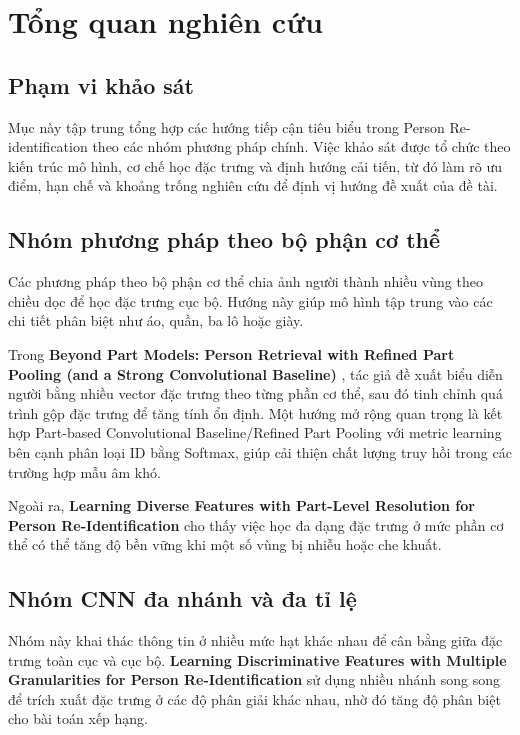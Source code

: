 \section{Tổng quan nghiên cứu}

\subsection{Phạm vi khảo sát}
Mục này tập trung tổng hợp các hướng tiếp cận tiêu biểu trong Person Re-identification theo các nhóm phương pháp chính. Việc khảo sát được tổ chức theo kiến trúc mô hình, cơ chế học đặc trưng và định hướng cải tiến, từ đó làm rõ ưu điểm, hạn chế và khoảng trống nghiên cứu để định vị hướng đề xuất của đề tài.

\subsection{Nhóm phương pháp theo bộ phận cơ thể}
Các phương pháp theo bộ phận cơ thể chia ảnh người thành nhiều vùng theo chiều dọc để học đặc trưng cục bộ. Hướng này giúp mô hình tập trung vào các chi tiết phân biệt như áo, quần, ba lô hoặc giày.

Trong \textbf{Beyond Part Models: Person Retrieval with Refined Part Pooling (and a Strong Convolutional Baseline)} \cite{sun2018modelspersonretrievalrefined}, tác giả đề xuất biểu diễn người bằng nhiều vector đặc trưng theo từng phần cơ thể, sau đó tinh chỉnh quá trình gộp đặc trưng để tăng tính ổn định. Một hướng mở rộng quan trọng là kết hợp Part-based Convolutional Baseline/Refined Part Pooling với metric learning bên cạnh phân loại ID bằng Softmax, giúp cải thiện chất lượng truy hồi trong các trường hợp mẫu âm khó.

Ngoài ra, \textbf{Learning Diverse Features with Part-Level Resolution for Person Re-Identification} \cite{xie2020learningdiversefeaturespartlevel} cho thấy việc học đa dạng đặc trưng ở mức phần cơ thể có thể tăng độ bền vững khi một số vùng bị nhiễu hoặc che khuất.

\subsection{Nhóm CNN đa nhánh và đa tỉ lệ}
Nhóm này khai thác thông tin ở nhiều mức hạt khác nhau để cân bằng giữa đặc trưng toàn cục và cục bộ. \textbf{Learning Discriminative Features with Multiple Granularities for Person Re-Identification} \cite{Wang_2018} sử dụng nhiều nhánh song song để trích xuất đặc trưng ở các độ phân giải khác nhau, nhờ đó tăng độ phân biệt cho bài toán xếp hạng.

